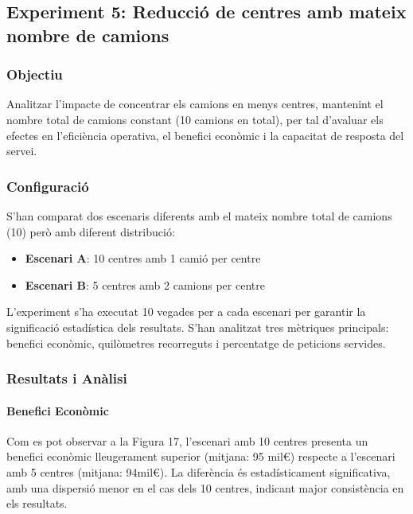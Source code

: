 \subsection{Experiment 5: Reducció de centres amb mateix nombre de camions}

\subsubsection{Objectiu}
Analitzar l'impacte de concentrar els camions en menys centres, mantenint el nombre total de camions constant (10 camions en total), per tal d'avaluar els efectes en l'eficiència operativa, el benefici econòmic i la capacitat de resposta del servei.


\subsubsection{Configuració}
S'han comparat dos escenaris diferents amb el mateix nombre total de camions (10) però amb diferent distribució:
\begin{itemize}
    \item \textbf{Escenari A}: 10 centres amb 1 camió per centre
    \item \textbf{Escenari B}: 5 centres amb 2 camions per centre
\end{itemize}

L'experiment s'ha executat 10 vegades per a cada escenari per garantir la significació estadística dels resultats. S'han analitzat tres mètriques principals: benefici econòmic, quilòmetres recorreguts i percentatge de peticions servides.

\subsubsection{Resultats i Anàlisi}

\paragraph{Benefici Econòmic}

Com es pot observar a la Figura 17, l'escenari amb 10 centres presenta un benefici econòmic lleugerament superior (mitjana: 95 mil€) respecte a l'escenari amb 5 centres (mitjana: 94mil€). La diferència és estadísticament significativa, amb una dispersió menor en el cas dels 10 centres, indicant major consistència en els resultats.


